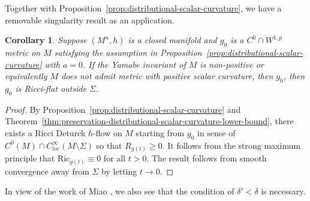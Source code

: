 \documentclass[12pt]{amsart}
\theoremstyle{plain}
\theoremstyle{plain}
\newtheorem{corollary}[subsection]{Corollary}
\theoremstyle{definition}
\theoremstyle{remark}
\numberwithin{equation}{subsection}
\newcommand{\hdel}{\tilde{\nabla}}
\begin{document}
%
%

Together with Proposition~\ref{prop:distributional-scalar-curvature}, we have a removable singularity result as an application.

\begin{corollary}\label{thm:non-cpt-dist-scalar-curvature-lower-bdd}
Suppose $(M^n,h)$ is a closed manifold and $g_0$ is a $C^0\cap W^{1,p}$ metric on $M$ satisfying the assumption in Proposition~\ref{prop:distributional-scalar-curvature} with $a=0$. If the Yamabe invariant of $M$ is non-positive or equivalently $M$ does not admit metric with positive scalar curvature, then $g_0$, then $g_0$ is Ricci-flat outside $\Sigma$.
\end{corollary}
\begin{proof}
By Proposition~\ref{prop:distributional-scalar-curvature} and Theorem~\ref{thm:preservation-distributional-scalar-curvature-lower-bound}, there exists a Ricci Deturck $h$-flow on $M$ starting from $g_0$ in sense of  $C^0(M)\cap C^\infty_{loc}(M\setminus\Sigma)$ so that $R_{g(t)}\geq 0$.  It follows from the strong maximum principle that $\mathrm{Ric}_{g(t)}\equiv 0$ for all $t>0$. The result follows from smooth convergence away from $\Sigma$ by letting $t\to0$.
\end{proof}
In view of the work of Miao \cite{miao_positive_2003}, we also see that the condition of $\delta'<\delta$ is necessary.


\printbibliography[title=References]
\end{document}
